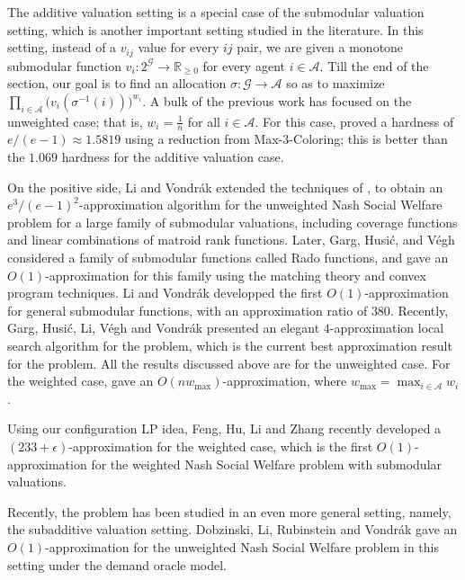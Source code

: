 \documentclass[10pt,a4paper]{article}
\theoremstyle{definition}
\theoremstyle{plain}
\newcommand\calA{{\mathcal{A}}}
\newcommand\calG{{\mathcal{G}}}
\newcommand{\R}{{\mathbb{R}}}
\begin{document}
The additive valuation setting is a special case of the submodular valuation setting, which is another important setting studied in the literature. In this setting, instead of a $v_{ij}$ value for every $ij$ pair, we are given a monotone submodular function $v_i: 2^{\calG} \to \R_{\geq 0}$ for every agent $i \in \calA$. Till the end of the section, our goal is to find an allocation $\sigma: \calG \to \calA$ so as to maximize $\prod_{i \in \calA} \Big(v_i(\sigma^{-1}(i))\Big)^{w_i}$. %
A bulk of the previous work has focused on the unweighted case; that is, $w_i = \frac1n$ for all $i \in \calA$. For this case, \cite{GKK23} proved a hardness of $e/(e-1)\approx 1.5819$ using a reduction from Max-3-Coloring; this is better than the $1.069$ hardness for the additive valuation case. 

On the positive side, Li and Vondr\'{a}k \cite{LV21} extended the techniques of \cite{AGS17}, to obtain an $e^3/(e-1)^2$-approximation algorithm for the unweighted Nash Social Welfare problem for a large family of submodular valuations, including coverage functions and linear combinations of matroid rank functions. Later, Garg, Husi\'{c}, and V\'{e}gh \cite{GHV21} considered a family of submodular functions called Rado functions, and gave an $O(1)$-approximation for this family using the matching theory and convex program techniques.  Li and Vondr\'{a}k \cite{LV22} developped the first $O(1)$-approximation for general submodular functions, with an approximation ratio of $380$.  Recently, Garg, Husi\'{c}, Li, V\'{e}gh and Vondr\'{a}k \cite{GHL23} presented an elegant $4$-approximation local search algorithm for the problem, which is the current best approximation result for the problem.  All the results discussed above are for the unweighted case. For the weighted case, \cite{GHL23} gave an $O(nw_{\max})$-approximation, where $w_{\max} = \max_{i \in \calA} w_i$. 

Using our configuration LP idea, Feng, Hu, Li and Zhang \cite{FHLZ25} recently developed a $(233+\epsilon)$-approximation for the weighted case, which is the first $O(1)$-approximation for the weighted Nash Social Welfare problem with submodular valuations. 


Recently, the problem has been studied in an even more general setting, namely, the subadditive valuation setting.  Dobzinski, Li, Rubinstein and Vondr\'{a}k \cite{DLR23} gave an $O(1)$-approximation for the unweighted Nash Social Welfare problem in this setting under the demand oracle model.
\end{document}
